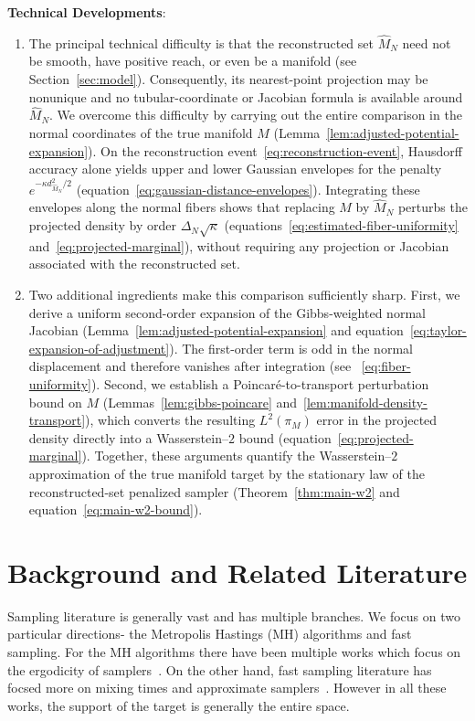 \documentclass{article}
\numberwithin{equation}{section}
\begin{document}
\textbf{Technical Developments}:
\begin{enumerate}
  \item The principal technical difficulty is that the reconstructed set $\widehat M_N$ need not be smooth, have positive reach, or even be a manifold (see Section~\ref{sec:model}). Consequently, its nearest-point projection may be nonunique and no tubular-coordinate or Jacobian formula is available around $\widehat M_N$. We overcome this difficulty by carrying out the entire comparison in the normal coordinates of the true manifold $M$ (Lemma~\ref{lem:adjusted-potential-expansion}). On the reconstruction event~\eqref{eq:reconstruction-event}, Hausdorff accuracy alone yields upper and lower Gaussian envelopes for the penalty $e^{-\kappa d_{\widehat M_N}^2/2}$ (equation~\eqref{eq:gaussian-distance-envelopes}). Integrating these envelopes along the normal fibers shows that replacing $M$ by $\widehat M_N$ perturbs the projected density by order $\Delta_N\sqrt{\kappa}$ (equations~\eqref{eq:estimated-fiber-uniformity} and~\eqref{eq:projected-marginal}), without requiring any projection or Jacobian associated with the reconstructed set.
  \item Two additional ingredients make this comparison sufficiently sharp. First, we derive a uniform second-order expansion of the Gibbs-weighted normal Jacobian (Lemma~\ref{lem:adjusted-potential-expansion} and equation~\eqref{eq:taylor-expansion-of-adjustment}). The first-order term is odd in the normal displacement and therefore vanishes after integration (see ~\eqref{eq:fiber-uniformity}). Second, we establish a Poincar\'e-to-transport perturbation bound on $M$ (Lemmas~\ref{lem:gibbs-poincare} and~\ref{lem:manifold-density-transport}), which converts the resulting $L^2(\pi_M)$ error in the projected density directly into a Wasserstein--$2$ bound (equation~\eqref{eq:projected-marginal}). Together, these arguments quantify the Wasserstein--$2$ approximation of the true manifold target by the stationary law of the reconstructed-set penalized sampler (Theorem~\ref{thm:main-w2} and equation~\eqref{eq:main-w2-bound}).
\end{enumerate}



\section{Background and Related Literature}\label{sec:background}
Sampling literature is generally vast and has multiple branches. We focus on two particular directions- the Metropolis Hastings (MH) algorithms and fast sampling. For the MH algorithms there have been multiple works which focus on the ergodicity of samplers~\citep{bhattacharya2025explicit, roberts1996geometric, roberts1996exponential,Brown_Jones_2024,vats2018strong}. On the other hand, fast sampling literature has focsed more on mixing times and approximate samplers~\citep{dalalyan2017theoretical, dalalyan2020sampling, durmus2019analysis, durmus2019high, 10.1214/16-AAP1238, mou2019high}. However in all these works, the support of the target is generally the entire space.
\end{document}
